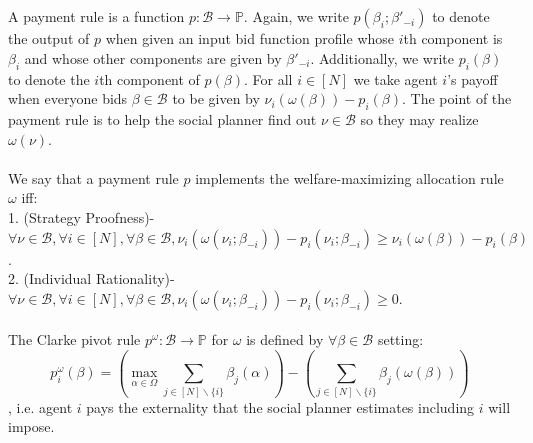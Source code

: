 \documentclass[11pt]{article}
\theoremstyle{definition}
\theoremstyle{plain}
\begin{document}
\\
\\
A payment rule is a function $p: \mathcal{B} \to \mathbb{P}$. Again, we write $p(\beta_i;\beta'_{-i})$ to denote the output of $p$ when given an input bid function profile whose $i$th component is $\beta_i$ and whose other components are given by $\beta'_{-i}$. Additionally, we write $p_i(\beta)$ to denote the $i$th component of $p(\beta)$. For all $i \in [N]$ we take agent $i$'s payoff when everyone bids $\beta \in \mathcal{B}$ to be given by $\nu_i(\omega(\beta))-p_i(\beta)$. The point of the payment rule is to help the social planner find out $\nu \in \mathcal{B}$ so they may realize $\omega(\nu)$. 
\\
\\
We say that a payment rule $p$ implements the welfare-maximizing allocation rule $\omega$ iff:
\\
1. (Strategy Proofness)- $\forall \nu \in \mathcal{B}, \forall i \in [N], \forall \beta \in \mathcal{B}, \nu_i(\omega(\nu_i;\beta_{-i}))-p_i(\nu_i;\beta_{-i}) \geq \nu_i(\omega(\beta))-p_i(\beta)$. 
\\
2. (Individual Rationality)- $\forall \nu \in \mathcal{B}, \forall i \in [N], \forall \beta \in \mathcal{B}, \nu_i(\omega(\nu_i;\beta_{-i}))-p_i(\nu_i;\beta_{-i}) \geq 0$.
\\
\\
The Clarke pivot rule $p^\omega:\mathcal{B} \to \mathbb{P}$ for $\omega$ is defined by $\forall \beta \in \mathcal{B}$ setting:
$$p^{\omega}_i(\beta)=\left(\max_{\alpha \in \Omega} \sum_{j \in [N] \backslash \{i\}} \beta_j(\alpha)\right)-\left(\sum_{j \in [N] \backslash \{i\}} \beta_j(\omega(\beta))\right)$$
, i.e. agent $i$ pays the externality that the social planner estimates including $i$ will impose.
\end{document}
